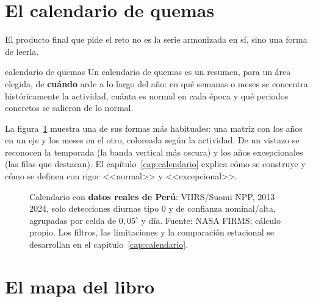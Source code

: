 \section{El calendario de quemas}

El producto final que pide el reto no es la serie armonizada en sí, sino una forma de leerla.

\begin{definicion}{calendario de quemas}
Un calendario de quemas es un resumen, para un área elegida, de \textbf{cuándo} arde a lo largo
del año: en qué semanas o meses se concentra históricamente la actividad, cuánta es normal en
cada época y qué periodos concretos se salieron de lo normal.
\end{definicion}

La figura~\ref{fig:calendario-intro} muestra una de sus formas más habituales: una matriz con
los años en un eje y los meses en el otro, coloreada según la actividad. De un vistazo se
reconocen la temporada (la banda vertical más oscura) y los años excepcionales (las filas que
destacan). El capítulo~\ref{cap:calendario} explica cómo se construye y cómo se definen con
rigor <<normal>> y <<excepcional>>.

\begin{figure}[ht]
\centering
{}
\caption{Calendario con \textbf{datos reales de Perú}: VIIRS/Suomi NPP, 2013--2024,
solo detecciones diurnas tipo 0 y de confianza nominal/alta, agrupadas por celda de
$0{,}05^\circ$ y día. Fuente: NASA FIRMS; cálculo propio. Los filtros, las limitaciones
y la comparación estacional se desarrollan en el capítulo~\ref{cap:calendario}.}
\label{fig:calendario-intro}
\end{figure}

\section{El mapa del libro}

